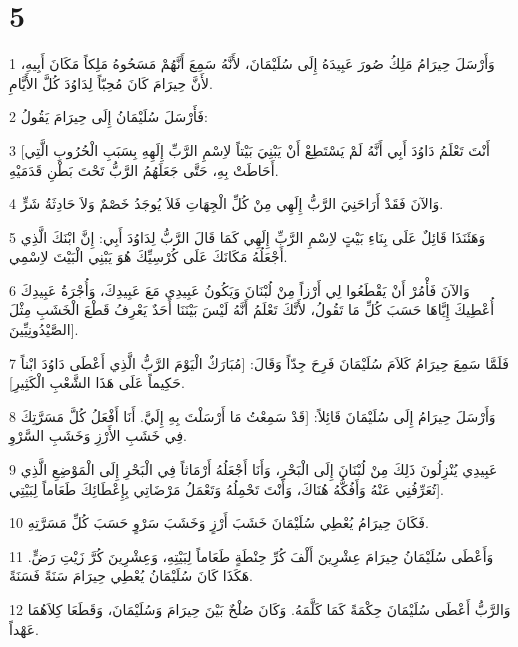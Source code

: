 \chapter{5}

\par 1 وَأَرْسَلَ حِيرَامُ مَلِكُ صُورَ عَبِيدَهُ إِلَى سُلَيْمَانَ، لأَنَّهُ سَمِعَ أَنَّهُمْ مَسَحُوهُ مَلِكاً مَكَانَ أَبِيهِ، لأَنَّ حِيرَامَ كَانَ مُحِبّاً لِدَاوُدَ كُلَّ الأَيَّامِ.
\par 2 فَأَرْسَلَ سُلَيْمَانُ إِلَى حِيرَامَ يَقُولُ:
\par 3 [أَنْتَ تَعْلَمُ دَاوُدَ أَبِي أَنَّهُ لَمْ يَسْتَطِعْ أَنْ يَبْنِيَ بَيْتاً لاِسْمِ الرَّبِّ إِلَهِهِ بِسَبَبِ الْحُرُوبِ الَّتِي أَحَاطَتْ بِهِ، حَتَّى جَعَلَهُمُ الرَّبُّ تَحْتَ بَطْنِ قَدَمَيْهِ.
\par 4 وَالآنَ فَقَدْ أَرَاحَنِيَ الرَّبُّ إِلَهِي مِنْ كُلِّ الْجِهَاتِ فَلاَ يُوجَدُ خَصْمٌ وَلاَ حَادِثَةُ شَرٍّ.
\par 5 وَهَئَنَذَا قَائِلٌ عَلَى بِنَاءِ بَيْتٍ لاِسْمِ الرَّبِّ إِلَهِي كَمَا قَالَ الرَّبُّ لِدَاوُدَ أَبِي: إِنَّ ابْنَكَ الَّذِي أَجْعَلُهُ مَكَانَكَ عَلَى كُرْسِيِّكَ هُوَ يَبْنِي الْبَيْتَ لاِسْمِي.
\par 6 وَالآنَ فَأْمُرْ أَنْ يَقْطَعُوا لِي أَرْزاً مِنْ لُبْنَانَ وَيَكُونُ عَبِيدِي مَعَ عَبِيدِكَ، وَأُجْرَةُ عَبِيدِكَ أُعْطِيكَ إِيَّاهَا حَسَبَ كُلِّ مَا تَقُولُ، لأَنَّكَ تَعْلَمُ أَنَّهُ لَيْسَ بَيْنَنَا أَحَدٌ يَعْرِفُ قَطْعَ الْخَشَبِ مِثْلَ الصَّيْدُونِيِّينَ].
\par 7 فَلَمَّا سَمِعَ حِيرَامُ كَلاَمَ سُلَيْمَانَ فَرِحَ جِدّاً وَقَالَ: [مُبَارَكٌ الْيَوْمَ الرَّبُّ الَّذِي أَعْطَى دَاوُدَ ابْناً حَكِيماً عَلَى هَذَا الشَّعْبِ الْكَثِيرِ].
\par 8 وَأَرْسَلَ حِيرَامُ إِلَى سُلَيْمَانَ قَائِلاً: [قَدْ سَمِعْتُ مَا أَرْسَلْتَ بِهِ إِلَيَّ. أَنَا أَفْعَلُ كُلَّ مَسَرَّتِكَ فِي خَشَبِ الأَرْزِ وَخَشَبِ السَّرْوِ.
\par 9 عَبِيدِي يُنْزِلُونَ ذَلِكَ مِنْ لُبْنَانَ إِلَى الْبَحْرِ، وَأَنَا أَجْعَلُهُ أَرْمَاثاً فِي الْبَحْرِ إِلَى الْمَوْضِعِ الَّذِي تُعَرِّفُنِي عَنْهُ وَأَفُكُّهُ هُنَاكَ، وَأَنْتَ تَحْمِلُهُ وَتَعْمَلُ مَرْضَاتِي بِإِعْطَائِكَ طَعَاماً لِبَيْتِي].
\par 10 فَكَانَ حِيرَامُ يُعْطِي سُلَيْمَانَ خَشَبَ أَرْزٍ وَخَشَبَ سَرْوٍ حَسَبَ كُلِّ مَسَرَّتِهِ.
\par 11 وَأَعْطَى سُلَيْمَانُ حِيرَامَ عِشْرِينَ أَلْفَ كُرِّ حِنْطَةٍ طَعَاماً لِبَيْتِهِ، وَعِشْرِينَ كُرَّ زَيْتِ رَضٍّ. هَكَذَا كَانَ سُلَيْمَانُ يُعْطِي حِيرَامَ سَنَةً فَسَنَةً.
\par 12 وَالرَّبُّ أَعْطَى سُلَيْمَانَ حِكْمَةً كَمَا كَلَّمَهُ. وَكَانَ صُلْحٌ بَيْنَ حِيرَامَ وَسُلَيْمَانَ، وَقَطَعَا كِلاَهُمَا عَهْداً.
